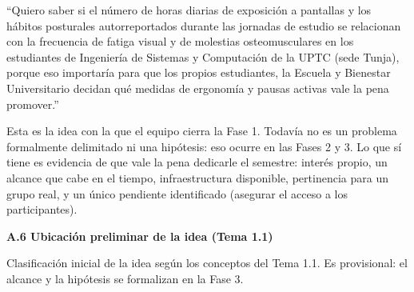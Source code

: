 \begin{tcolorbox}[colback=badgebg,colframe=badgeborder,boxrule=0.5pt,arc=4pt,
  title={Idea de investigación --- versión ajustada},
  coltitle=black,colbacktitle=badgebg,fonttitle=\bfseries\small]
``Quiero saber si el número de horas diarias de exposición a pantallas y los hábitos
posturales autorreportados durante las jornadas de estudio se relacionan con la
frecuencia de fatiga visual y de molestias osteomusculares en los estudiantes de
Ingeniería de Sistemas y Computación de la UPTC (sede Tunja), porque eso importaría
para que los propios estudiantes, la Escuela y Bienestar Universitario decidan qué
medidas de ergonomía y pausas activas vale la pena promover.''
\end{tcolorbox}

\noindent Esta es la idea con la que el equipo cierra la Fase 1. Todavía no es un
problema formalmente delimitado ni una hipótesis: eso ocurre en las Fases 2 y 3. Lo
que sí tiene es evidencia de que vale la pena dedicarle el semestre: interés propio,
un alcance que cabe en el tiempo, infraestructura disponible, pertinencia para un
grupo real, y un único pendiente identificado (asegurar el acceso a los
participantes).

\bigskip
\noindent\textbf{A.6 Ubicación preliminar de la idea (Tema 1.1)}

\noindent Clasificación inicial de la idea según los conceptos del Tema 1.1. Es
provisional: el alcance y la hipótesis se formalizan en la Fase 3.

